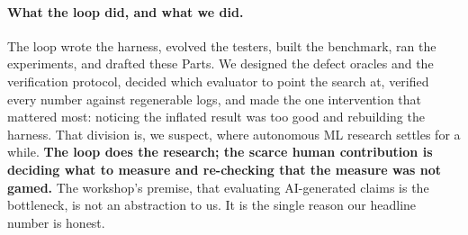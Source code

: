 \documentclass[11pt]{article}
\begin{document}
\paragraph{What the loop did, and what we did.}
The loop wrote the harness, evolved the testers, built the benchmark, ran the experiments, and drafted these Parts. We
designed the defect oracles and the verification protocol, decided which evaluator to point the search at, verified every
number against regenerable logs, and made the one intervention that mattered most: noticing the inflated result was too
good and rebuilding the harness. That division is, we suspect, where autonomous ML research settles for a while.
\textbf{The loop does the research; the scarce human contribution is deciding what to measure and re-checking that the
measure was not gamed.} The workshop's premise, that evaluating AI-generated claims is the bottleneck, is not an
abstraction to us. It is the single reason our headline number is honest.



\end{document}
